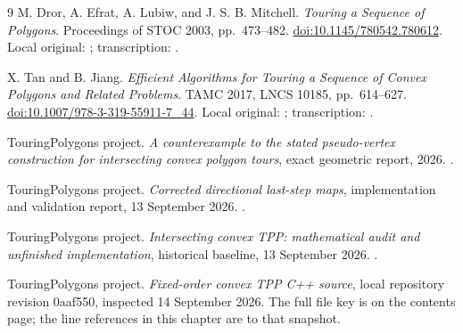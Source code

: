 \documentclass[12pt,a4paper]{article}
\newcommand{\code}[1]{{\ttfamily\color{codekw}#1}}
\begin{document}
\clearpage
{}
\begin{thebibliography}{9}
 M. Dror, A. Efrat, A. Lubiw, and J. S. B. Mitchell.
\emph{Touring a Sequence of Polygons}. Proceedings of STOC 2003, pp.~473--482.
\href{https://doi.org/10.1145/780542.780612}{doi:10.1145/780542.780612}.
Local original: ; transcription: .

 X. Tan and B. Jiang.
\emph{Efficient Algorithms for Touring a Sequence of Convex Polygons and Related Problems}.
TAMC 2017, LNCS 10185, pp.~614--627.
\href{https://doi.org/10.1007/978-3-319-55911-7_44}{doi:10.1007/978-3-319-55911-7\_44}.
Local original: ; transcription: .

 TouringPolygons project.
\emph{A counterexample to the stated pseudo-vertex construction for intersecting convex polygon tours}, exact geometric report, 2026.
.

 TouringPolygons project.
\emph{Corrected directional last-step maps}, implementation and validation report, 13 September 2026.
.

 TouringPolygons project.
\emph{Intersecting convex TPP: mathematical audit and unfinished implementation}, historical baseline, 13 September 2026.
.

 TouringPolygons project.
\emph{Fixed-order convex TPP C++ source}, local repository revision \code{0aaf550}, inspected 14 September 2026.
The full file key is on the contents page; the line references in this chapter are to that snapshot.
\end{thebibliography}
\end{document}
